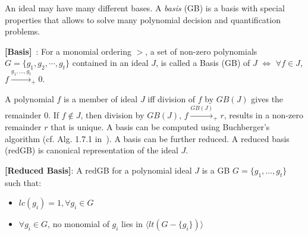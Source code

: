 An ideal may have many different bases. A {\it \Grobner basis} (GB) is
a basis with special properties that allows to solve many polynomial
decision and quantification problems. 
\begin{Definition}
\label{def:gb}
{\bf [\Grobner Basis]}~\cite{gb_book}: 
For a monomial ordering $>$, a set of non-zero polynomials $G =
\{g_1,g_2,\cdots,g_t\}$ contained in an ideal $J$, is called a
\Grobner Basis (GB) of $J$ $\iff$
$\forall f \in J$, $f\xrightarrow{g_1,\dots,g_t}_+0$. 
\end{Definition}
A polynomial $f$ is a member of ideal $J$ iff division of $f$ by
$GB(J)$ gives the remainder 0. If $f \notin J$,
then division by $GB(J)$, $f\xrightarrow{GB(J)}_+r$, results in a
non-zero remainder $r$ that is unique.
A \Grobner basis can be computed using Buchberger's 
algorithm (cf. Alg. 1.7.1 in~\cite{gb_book}). 
A \Grobner basis can be further reduced. A reduced \Grobner basis
(redGB) is canonical representation of the ideal $J$.

\begin{Definition} \label{def:rgb}
{\bf [Reduced \Grobner Basis]}:
    A redGB for a polynomial ideal $J$ is 
    a GB $G=\{g_{1},\dots,g_{t}\}$ such that:
    \begin{itemize}
        \item $lc(g_{i})=1,\forall g_{i}\in G$
        \item $\forall g_{i} \in G$, no monomial of $g_{i}$ 
        lies in $\langle lt(G-\{g_{i}\})\rangle$
    \end{itemize}
\end{Definition}



